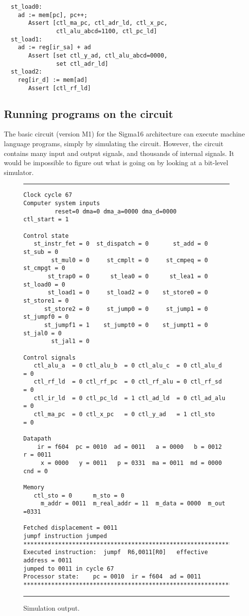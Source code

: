 \documentclass[submission,copyright,creativecommons]{eptcs}
\begin{document}
{\footnotesize
\begin{verbatim}
  st_load0:
    ad := mem[pc], pc++;
       Assert [ctl_ma_pc, ctl_adr_ld, ctl_x_pc,
               ctl_alu_abcd=1100, ctl_pc_ld]
  st_load1:
    ad := reg[ir_sa] + ad
       Assert [set ctl_y_ad, ctl_alu_abcd=0000,
               set ctl_adr_ld]
  st_load2:
    reg[ir_d] := mem[ad]
       Assert [ctl_rf_ld]
\end{verbatim}
}

\subsection{Running programs on the circuit}

The basic circuit (version M1) for the Sigma16 architecture can
execute machine language programs, simply by simulating the
circuit.  However, the circuit contains many input and output
signals, and thousands of internal signals.  It would be impossible
to figure out what is going on by looking at a bit-level simulator.

\begin{figure}[t]
\hrule
\vspace{0.6em}
{\footnotesize
\begin{verbatim}
Clock cycle 67
Computer system inputs
         reset=0 dma=0 dma_a=0000 dma_d=0000
ctl_start = 1

Control state
   st_instr_fet = 0  st_dispatch = 0       st_add = 0       st_sub = 0
        st_mul0 = 0     st_cmplt = 0     st_cmpeq = 0     st_cmpgt = 0
       st_trap0 = 0      st_lea0 = 0      st_lea1 = 0     st_load0 = 0
       st_load1 = 0     st_load2 = 0    st_store0 = 0    st_store1 = 0
      st_store2 = 0     st_jump0 = 0     st_jump1 = 0    st_jumpf0 = 0
      st_jumpf1 = 1    st_jumpt0 = 0    st_jumpt1 = 0      st_jal0 = 0
        st_jal1 = 0

Control signals
   ctl_alu_a  = 0 ctl_alu_b  = 0 ctl_alu_c  = 0 ctl_alu_d  = 0
   ctl_rf_ld  = 0 ctl_rf_pc  = 0 ctl_rf_alu = 0 ctl_rf_sd  = 0
   ctl_ir_ld  = 0 ctl_pc_ld  = 1 ctl_ad_ld  = 0 ctl_ad_alu = 0
   ctl_ma_pc  = 0 ctl_x_pc   = 0 ctl_y_ad   = 1 ctl_sto    = 0

Datapath
    ir = f604  pc = 0010  ad = 0011   a = 0000   b = 0012   r = 0011
     x = 0000   y = 0011   p = 0331  ma = 0011  md = 0000 cnd = 0

Memory
   ctl_sto = 0      m_sto = 0
     m_addr = 0011  m_real_addr = 11  m_data = 0000  m_out =0331

Fetched displacement = 0011
jumpf instruction jumped
************************************************************************
Executed instruction:  jumpf  R6,0011[R0]   effective address = 0011
jumped to 0011 in cycle 67
Processor state:    pc = 0010  ir = f604  ad = 0011
************************************************************************
\end{verbatim}
}
\hrule
\caption{Simulation output.}
\label{fig:simulation-output}
\end{figure}
\end{document}
